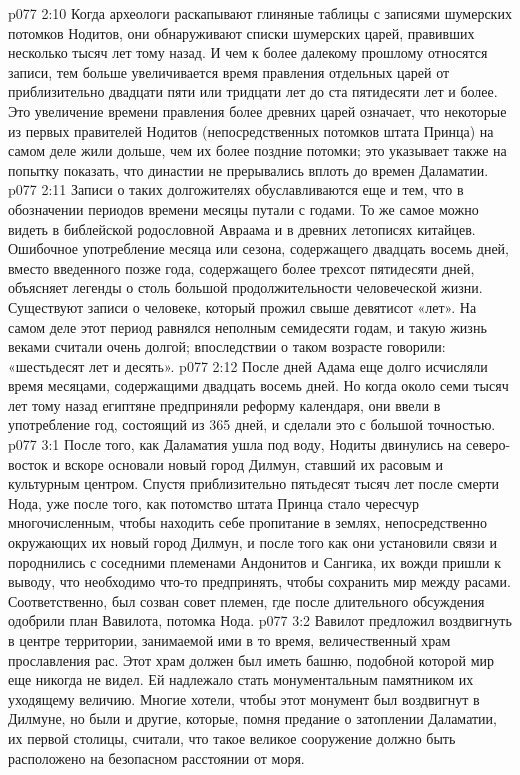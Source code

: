 \vs p077 2:10 Когда археологи раскапывают глиняные таблицы с записями шумерских потомков Нодитов, они обнаруживают списки шумерских царей, правивших несколько тысяч лет тому назад. И чем к более далекому прошлому относятся записи, тем больше увеличивается время правления отдельных царей от приблизительно двадцати пяти или тридцати лет до ста пятидесяти лет и более. Это увеличение времени правления более древних царей означает, что некоторые из первых правителей Нодитов (непосредственных потомков штата Принца) на самом деле жили дольше, чем их более поздние потомки; это указывает также на попытку показать, что династии не прерывались вплоть до времен Даламатии.
\vs p077 2:11 Записи о таких долгожителях обуславливаются еще и тем, что в обозначении периодов времени месяцы путали с годами. То же самое можно видеть в библейской родословной Авраама и в древних летописях китайцев. Ошибочное употребление месяца или сезона, содержащего двадцать восемь дней, вместо введенного позже года, содержащего более трехсот пятидесяти дней, объясняет легенды о столь большой продолжительности человеческой жизни. Существуют записи о человеке, который прожил свыше девятисот «лет». На самом деле этот период равнялся неполным семидесяти годам, и такую жизнь веками считали очень долгой; впоследствии о таком возрасте говорили: «шестьдесят лет и десять».
\vs p077 2:12 После дней Адама еще долго исчисляли время месяцами, содержащими двадцать восемь дней. Но когда около семи тысяч лет тому назад египтяне предприняли реформу календаря, они ввели в употребление год, состоящий из 365 дней, и сделали это с большой точностью.
\vs p077 3:1 После того, как Даламатия ушла под воду, Нодиты двинулись на северо\hyp{}восток и вскоре основали новый город Дилмун, ставший их расовым и культурным центром. Спустя приблизительно пятьдесят тысяч лет после смерти Нода, уже после того, как потомство штата Принца стало чересчур многочисленным, чтобы находить себе пропитание в землях, непосредственно окружающих их новый город Дилмун, и после того как они установили связи и породнились с соседними племенами Андонитов и Сангика, их вожди пришли к выводу, что необходимо что\hyp{}то предпринять, чтобы сохранить мир между расами. Соответственно, был созван совет племен, где после длительного обсуждения одобрили план Вавилота, потомка Нода.
\vs p077 3:2 Вавилот предложил воздвигнуть в центре территории, занимаемой ими в то время, величественный храм прославления рас. Этот храм должен был иметь башню, подобной которой мир еще никогда не видел. Ей надлежало стать монументальным памятником их уходящему величию. Многие хотели, чтобы этот монумент был воздвигнут в Дилмуне, но были и другие, которые, помня предание о затоплении Даламатии, их первой столицы, считали, что такое великое сооружение должно быть расположено на безопасном расстоянии от моря.
